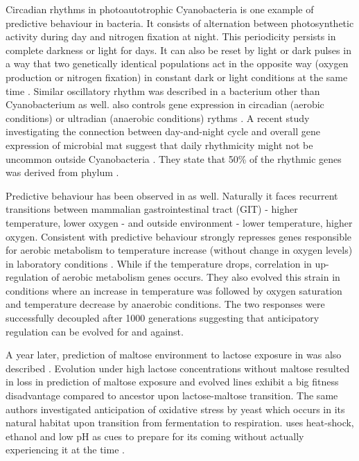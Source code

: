 Circadian rhythms in photoautotrophic Cyanobacteria is one example of predictive behaviour in bacteria.
It consists of alternation between photosynthetic activity during day and nitrogen fixation at night.
This periodicity persists in complete darkness or light for days.
It can also be reset by light or dark pulses in a way that two genetically identical populations act in the opposite way (oxygen production or nitrogen fixation) in constant dark or light conditions at the same time \cite{kondo1993circadian}.
Similar oscillatory rhythm was described in a bacterium other than Cyanobacterium as well.
 also controls gene expression in circadian (aerobic conditions) or ultradian (anaerobic conditions) rythms \cite{min2005rhythmic}.
A recent study investigating the connection between day-and-night cycle and overall gene expression of microbial mat suggest that daily rhythmicity might not be uncommon outside Cyanobacteria \cite{hornlein2018daily}.
They state that 50\% of the rhythmic genes was derived from phylum .

Predictive behaviour has been observed in  as well.
Naturally it faces recurrent transitions between mammalian gastrointestinal tract (GIT) - higher temperature, lower oxygen - and outside environment - lower temperature, higher oxygen.
Consistent with predictive behaviour  strongly represses genes responsible for aerobic metabolism to temperature increase (without change in oxygen levels) in laboratory conditions \cite{tagkopoulos2008predictive}.
While if the temperature drops, correlation in up-regulation of aerobic metabolism genes occurs.
They also evolved this strain in conditions where an increase in temperature was followed by oxygen saturation and temperature decrease by anaerobic conditions.
The two responses were successfully decoupled after 1000 generations suggesting that anticipatory regulation can be evolved for and against.

A year later, prediction of maltose environment to lactose exposure in  was also described \cite{mitchell2009adaptive}.
Evolution under high lactose concentrations without maltose resulted in loss in prediction of maltose exposure and evolved lines exhibit a big fitness disadvantage compared to ancestor upon lactose-maltose transition.
The same authors investigated anticipation of oxidative stress by yeast which occurs in its natural habitat upon transition from fermentation to respiration.
 uses heat-shock, ethanol and low pH as cues to prepare for its coming without actually experiencing it at the time \cite{mitchell2009adaptive}.


